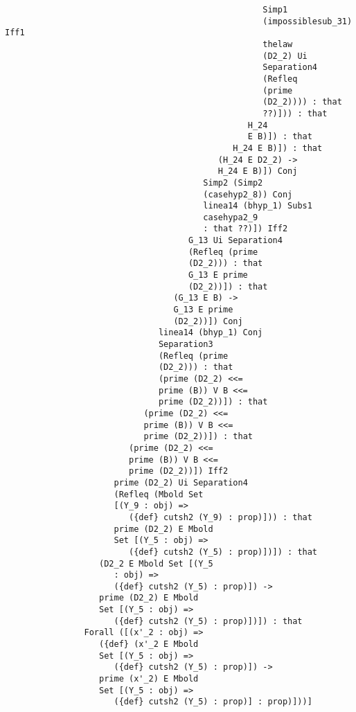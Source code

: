 \documentclass[12pt]{article}
\begin{document}
\begin{verbatim}
                                                    Simp1 
                                                    (impossiblesub_31) Iff1 
                                                    thelaw 
                                                    (D2_2) Ui 
                                                    Separation4 
                                                    (Refleq 
                                                    (prime 
                                                    (D2_2)))) : that 
                                                    ??)])) : that 
                                                 H_24 
                                                 E B)]) : that 
                                              H_24 E B)]) : that 
                                           (H_24 E D2_2) -> 
                                           H_24 E B)]) Conj 
                                        Simp2 (Simp2 
                                        (casehyp2_8)) Conj 
                                        linea14 (bhyp_1) Subs1 
                                        casehypa2_9 
                                        : that ??)]) Iff2 
                                     G_13 Ui Separation4 
                                     (Refleq (prime 
                                     (D2_2))) : that 
                                     G_13 E prime 
                                     (D2_2))]) : that 
                                  (G_13 E B) -> 
                                  G_13 E prime 
                                  (D2_2))]) Conj 
                               linea14 (bhyp_1) Conj 
                               Separation3 
                               (Refleq (prime 
                               (D2_2))) : that 
                               (prime (D2_2) <<= 
                               prime (B)) V B <<= 
                               prime (D2_2))]) : that 
                            (prime (D2_2) <<= 
                            prime (B)) V B <<= 
                            prime (D2_2))]) : that 
                         (prime (D2_2) <<= 
                         prime (B)) V B <<= 
                         prime (D2_2))]) Iff2 
                      prime (D2_2) Ui Separation4 
                      (Refleq (Mbold Set 
                      [(Y_9 : obj) => 
                         ({def} cutsh2 (Y_9) : prop)])) : that 
                      prime (D2_2) E Mbold 
                      Set [(Y_5 : obj) => 
                         ({def} cutsh2 (Y_5) : prop)])]) : that 
                   (D2_2 E Mbold Set [(Y_5 
                      : obj) => 
                      ({def} cutsh2 (Y_5) : prop)]) -> 
                   prime (D2_2) E Mbold 
                   Set [(Y_5 : obj) => 
                      ({def} cutsh2 (Y_5) : prop)])]) : that 
                Forall ([(x'_2 : obj) => 
                   ({def} (x'_2 E Mbold 
                   Set [(Y_5 : obj) => 
                      ({def} cutsh2 (Y_5) : prop)]) -> 
                   prime (x'_2) E Mbold 
                   Set [(Y_5 : obj) => 
                      ({def} cutsh2 (Y_5) : prop)] : prop)]))]



\end{verbatim}
\end{document}
